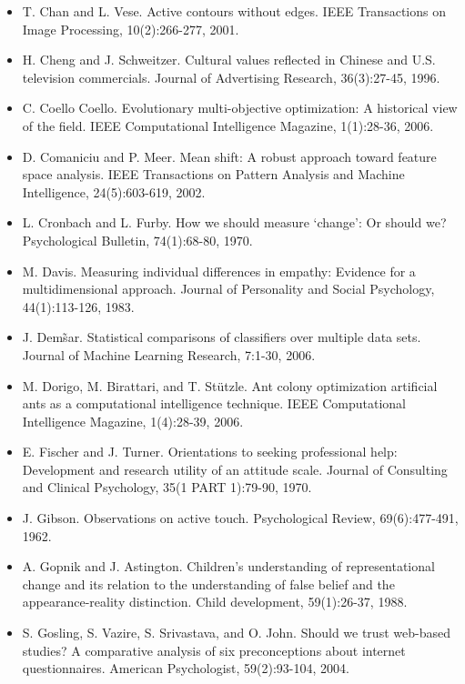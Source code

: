 \documentclass[10pt,letterpaper]{article}
\begin{document}
\begin{itemize}
\item T. Chan and L. Vese. Active contours without edges. IEEE Transactions on Image Processing, 10(2):266-277, 2001. %
\item H. Cheng and J. Schweitzer. Cultural values reflected in Chinese and U.S. television commercials. Journal of Advertising Research, 36(3):27-45, 1996. %
\item C. Coello Coello. Evolutionary multi-objective optimization: A historical view of the field. IEEE Computational Intelligence Magazine, 1(1):28-36, 2006. %
\item D. Comaniciu and P. Meer. Mean shift: A robust approach toward feature space analysis. IEEE Transactions on Pattern Analysis and Machine Intelligence, 24(5):603-619, 2002.  %
\item L. Cronbach and L. Furby. How we should measure `change': Or should we? Psychological Bulletin, 74(1):68-80, 1970. %
\item M. Davis. Measuring individual differences in empathy: Evidence for a multidimensional approach. Journal of Personality and Social Psychology, 44(1):113-126, 1983. %
\item J. Dem\~{s}ar. Statistical comparisons of classifiers over multiple data sets. Journal of Machine Learning Research, 7:1-30, 2006. %
\item M. Dorigo, M. Birattari, and T. St\"{u}tzle. Ant colony optimization artificial ants as a computational intelligence technique. IEEE Computational Intelligence Magazine, 1(4):28-39, 2006. %
\item E. Fischer and J. Turner. Orientations to seeking professional help: Development and research utility of an attitude scale. Journal of Consulting and Clinical Psychology, 35(1 PART 1):79-90, 1970. %
\item J. Gibson. Observations on active touch. Psychological Review, 69(6):477-491, 1962. %
\item A. Gopnik and J. Astington. Children's understanding of representational change and its relation to the understanding of false belief and the appearance-reality distinction. Child development, 59(1):26-37, 1988. %
\item S. Gosling, S. Vazire, S. Srivastava, and O. John. Should we trust web-based studies? A comparative analysis of six preconceptions about internet questionnaires. American Psychologist, 59(2):93-104, 2004. %

\end{itemize}
\end{document}
